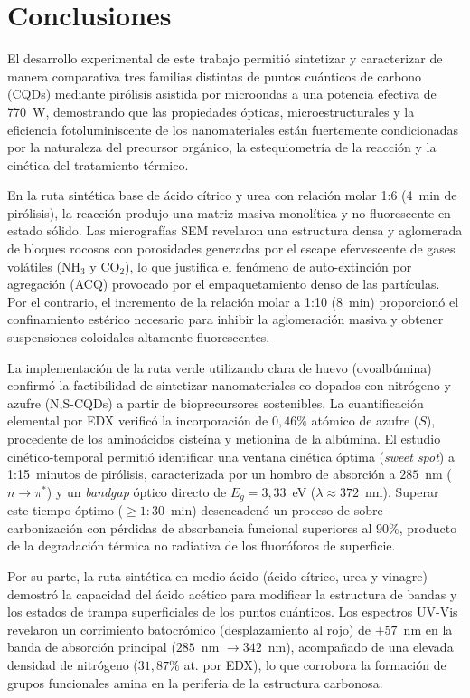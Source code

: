 \section{Conclusiones}
\label{sec:conclusiones}

El desarrollo experimental de este trabajo permitió sintetizar y caracterizar de manera comparativa tres familias distintas de puntos cuánticos de carbono (CQDs) mediante pirólisis asistida por microondas a una potencia efectiva de 770~W, demostrando que las propiedades ópticas, microestructurales y la eficiencia fotoluminiscente de los nanomateriales están fuertemente condicionadas por la naturaleza del precursor orgánico, la estequiometría de la reacción y la cinética del tratamiento térmico.

En la ruta sintética base de ácido cítrico y urea con relación molar 1:6 (4~min de pirólisis), la reacción produjo una matriz masiva monolítica y no fluorescente en estado sólido. Las micrografías SEM revelaron una estructura densa y aglomerada de bloques rocosos con porosidades generadas por el escape efervescente de gases volátiles ($\text{NH}_3$ y $\text{CO}_2$), lo que justifica el fenómeno de auto-extinción por agregación (ACQ) provocado por el empaquetamiento denso de las partículas. Por el contrario, el incremento de la relación molar a 1:10 (8~min) proporcionó el confinamiento estérico necesario para inhibir la aglomeración masiva y obtener suspensiones coloidales altamente fluorescentes.

La implementación de la ruta verde utilizando clara de huevo (ovoalbúmina) confirmó la factibilidad de sintetizar nanomateriales co-dopados con nitrógeno y azufre (N,S-CQDs) a partir de bioprecursores sostenibles. La cuantificación elemental por EDX verificó la incorporación de $0{,}46\%$ atómico de azufre ($S$), procedente de los aminoácidos cisteína y metionina de la albúmina. El estudio cinético-temporal permitió identificar una ventana cinética óptima (\textit{sweet spot}) a 1:15~minutos de pirólisis, caracterizada por un hombro de absorción a $285$~nm ($n \to \pi^*$) y un \textit{bandgap} óptico directo de $E_g = 3{,}33$~eV ($\lambda \approx 372$~nm). Superar este tiempo óptimo ($\ge 1:30$~min) desencadenó un proceso de sobre-carbonización con pérdidas de absorbancia funcional superiores al $90\%$, producto de la degradación térmica no radiativa de los fluoróforos de superficie.

Por su parte, la ruta sintética en medio ácido (ácido cítrico, urea y vinagre) demostró la capacidad del ácido acético para modificar la estructura de bandas y los estados de trampa superficiales de los puntos cuánticos. Los espectros UV-Vis revelaron un corrimiento batocrómico (desplazamiento al rojo) de $+57$~nm en la banda de absorción principal ($285$~nm $\to 342$~nm), acompañado de una elevada densidad de nitrógeno ($31{,}87\%$ at. por EDX), lo que corrobora la formación de grupos funcionales amina en la periferia de la estructura carbonosa.

